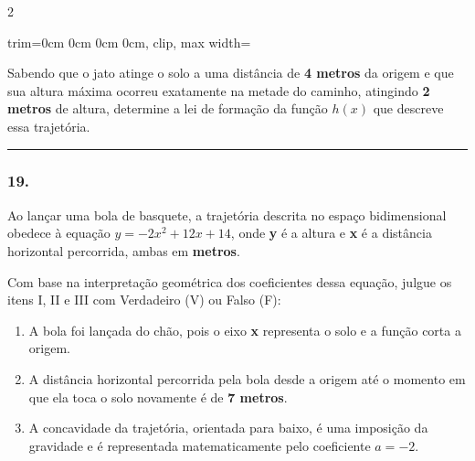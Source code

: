 \documentclass[twoside, 10pt, a4paper]{article}
\newlength{\espacoPreQuestao}
\newlength{\espacoQuestao}
\newlength{\larguraTikz}
\begin{document}
\begin{multicols*}{2}
\begin{center}
\begin{adjustbox}{trim=0cm 0cm 0cm 0cm, clip, max width=\larguraTikz}
\end{adjustbox}
\end{center}

Sabendo que o jato atinge o solo a uma distância de \textbf{4 metros} da origem e que sua altura máxima ocorreu exatamente na metade do caminho, atingindo \textbf{2 metros} de altura, determine a lei de formação da função $h(x)$ que descreve essa trajetória.
\par\vspace{\espacoQuestao}

\noindent\textcolor{CorLinha}{\rule{\linewidth}{0.5pt}} 
\par\vspace{\espacoPreQuestao}
\subsubsection*{19.} Ao lançar uma bola de basquete, a trajetória descrita no espaço bidimensional obedece à equação $y = -2x^2 + 12x + 14$, onde \textbf{y} é a altura e \textbf{x} é a distância horizontal percorrida, ambas em \textbf{metros}.

Com base na interpretação geométrica dos coeficientes dessa equação, julgue os itens I, II e III com Verdadeiro (V) ou Falso (F):

\begin{enumerate}[label=\Roman*.]
    \item A bola foi lançada do chão, pois o eixo \textbf{x} representa o solo e a função corta a origem.
    \item A distância horizontal percorrida pela bola desde a origem até o momento em que ela toca o solo novamente é de \textbf{7 metros}.
    \item A concavidade da trajetória, orientada para baixo, é uma imposição da gravidade e é representada matematicamente pelo coeficiente $a = -2$.
\end{enumerate}
\par\vspace{\espacoQuestao}


\end{multicols*}
\end{document}
